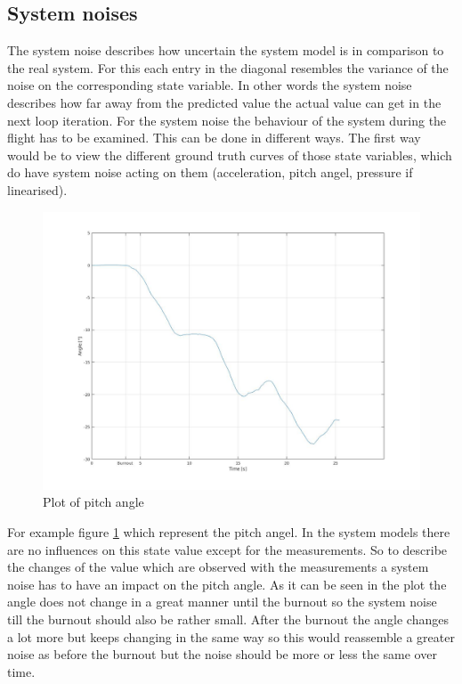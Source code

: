 \subsection{System noises}
The system noise describes how uncertain the system model is in comparison to the real system.
For this each entry in the diagonal resembles the variance of the noise on the corresponding state variable.
In other words the system noise describes how far away from the predicted value the actual value can get in the next loop iteration.
For the system noise the behaviour of the system during the flight has to be examined.
This can be done in different ways.
The first way would be to view the different ground truth curves of those state variables,
which do have system noise acting on them (acceleration, pitch angel, pressure if linearised).
\begin{figure}[h]
 \centering
 \includegraphics[width=.8\textwidth]{./Pictures/PitchAnglePlot.jpg}
 \caption{Plot of pitch angle}
 \label{fig:PitchAnglePlot}
\end{figure}
For example figure \ref{fig:PitchAnglePlot} which represent the pitch angel.
In the system models there are no influences on this state value except for the measurements.
So to describe the changes of the value which are observed with the measurements a system noise has to have an impact on the pitch angle.
As it can be seen in the plot the angle does not change in a great manner until the burnout so the system noise till the burnout should also be rather small.
After the burnout the angle changes a lot more but keeps changing in the same way so this would reassemble a greater noise as before the burnout 
but the noise should be more or less the same over time. \\

